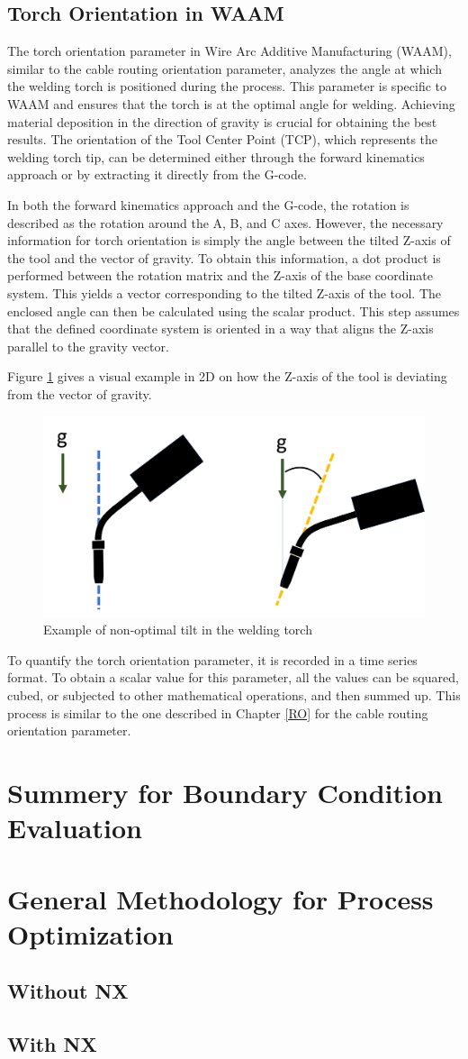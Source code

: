   

\subsection{Torch Orientation in WAAM}
The torch orientation parameter in Wire Arc Additive Manufacturing (WAAM), similar to the cable routing orientation parameter, analyzes the angle at which the welding torch is positioned during the process. This parameter is specific to WAAM and ensures that the torch is at the optimal angle for welding. Achieving material deposition in the direction of gravity is crucial for obtaining the best results. The orientation of the Tool Center Point (TCP), which represents the welding torch tip, can be determined either through the forward kinematics approach or by extracting it directly from the G-code.

In both the forward kinematics approach and the G-code, the rotation is described as the rotation around the A, B, and C axes. However, the necessary information for torch orientation is simply the angle between the tilted Z-axis of the tool and the vector of gravity. To obtain this information, a dot product is performed between the rotation matrix and the Z-axis of the base coordinate system. This yields a vector corresponding to the tilted Z-axis of the tool. The enclosed angle can then be calculated using the scalar product. This step assumes that the defined coordinate system is oriented in a way that aligns the Z-axis parallel to the gravity vector.

Figure \ref{tilt} gives a visual example in 2D on how the Z-axis of the tool is deviating from the vector of gravity.

\begin{figure}[H]
	\centerline{\includegraphics[width=.5\textwidth]{figures/ttilt.png}}
	\caption{Example of non-optimal tilt in the welding torch}
	\label{tilt}
\end{figure}

To quantify the torch orientation parameter, it is recorded in a time series format. To obtain a scalar value for this parameter, all the values can be squared, cubed, or subjected to other mathematical operations, and then summed up. This process is similar to the one described in Chapter \ref{RO} for the cable routing orientation parameter.



\section{Summery for Boundary Condition Evaluation}
\section{General Methodology for Process Optimization}
\subsection{Without NX}
\subsection{With NX}